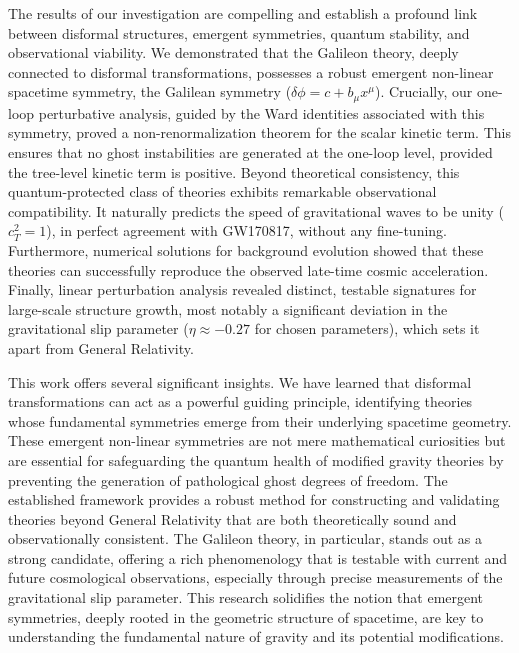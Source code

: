 \documentclass[twocolumn]{aastex631}
\begin{document}
The results of our investigation are compelling and establish a profound link between disformal structures, emergent symmetries, quantum stability, and observational viability. We demonstrated that the Galileon theory, deeply connected to disformal transformations, possesses a robust emergent non-linear spacetime symmetry, the Galilean symmetry ($\delta\phi = c + b_\mu x^\mu$). Crucially, our one-loop perturbative analysis, guided by the Ward identities associated with this symmetry, proved a non-renormalization theorem for the scalar kinetic term. This ensures that no ghost instabilities are generated at the one-loop level, provided the tree-level kinetic term is positive. Beyond theoretical consistency, this quantum-protected class of theories exhibits remarkable observational compatibility. It naturally predicts the speed of gravitational waves to be unity ($c_T^2=1$), in perfect agreement with GW170817, without any fine-tuning. Furthermore, numerical solutions for background evolution showed that these theories can successfully reproduce the observed late-time cosmic acceleration. Finally, linear perturbation analysis revealed distinct, testable signatures for large-scale structure growth, most notably a significant deviation in the gravitational slip parameter ($\eta \approx -0.27$ for chosen parameters), which sets it apart from General Relativity.

This work offers several significant insights. We have learned that disformal transformations can act as a powerful guiding principle, identifying theories whose fundamental symmetries emerge from their underlying spacetime geometry. These emergent non-linear symmetries are not mere mathematical curiosities but are essential for safeguarding the quantum health of modified gravity theories by preventing the generation of pathological ghost degrees of freedom. The established framework provides a robust method for constructing and validating theories beyond General Relativity that are both theoretically sound and observationally consistent. The Galileon theory, in particular, stands out as a strong candidate, offering a rich phenomenology that is testable with current and future cosmological observations, especially through precise measurements of the gravitational slip parameter. This research solidifies the notion that emergent symmetries, deeply rooted in the geometric structure of spacetime, are key to understanding the fundamental nature of gravity and its potential modifications.

{}

\end{document}
